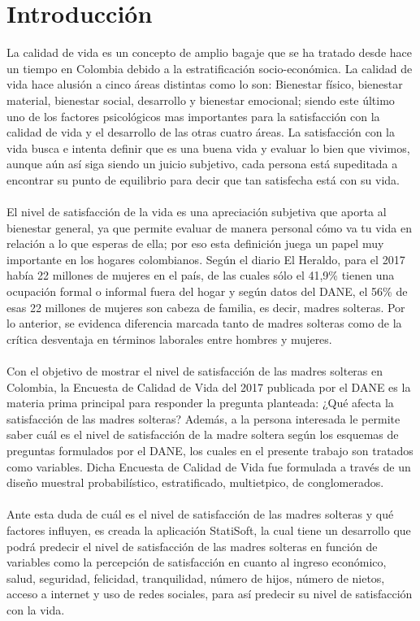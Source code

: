 \documentclass[11pt,twoside]{article}
\begin{document}
\section{Introducción}
\noindent
La calidad de vida es un concepto de amplio bagaje que se ha tratado desde hace un tiempo en Colombia debido a la estratificación socio-económica. La calidad de vida hace alusión a cinco áreas distintas como lo son: Bienestar físico, bienestar material, bienestar social, desarrollo y bienestar emocional; siendo este último uno de los factores psicológicos mas importantes para la satisfacción con la calidad de vida y el desarrollo de las otras cuatro áreas. La satisfacción con la vida busca e intenta definir  que es una buena vida y evaluar lo bien que vivimos, aunque aún así siga siendo un juicio subjetivo, cada persona está supeditada a encontrar su punto de equilibrio para decir que tan satisfecha está con su vida.
\\
\\
\noindent
El nivel de satisfacción de la vida es una apreciación subjetiva que aporta al bienestar general, ya que permite evaluar de manera personal cómo va tu vida en relación a lo que esperas de ella; por eso esta definición juega un papel muy importante en los hogares colombianos. Según el diario El Heraldo, para el 2017 había 22 millones de mujeres en el país, de las cuales sólo el 41,9{\%} tienen una ocupación formal o informal fuera del hogar y según datos del DANE, el 56{\%} de esas 22 millones de mujeres son cabeza de familia, es decir, madres solteras. Por lo anterior, se evidenca diferencia marcada tanto de madres solteras como de la crítica desventaja en términos laborales entre hombres y mujeres.
\\
\\
\noindent
Con el objetivo de mostrar el nivel de satisfacción de las madres solteras en Colombia, la Encuesta de Calidad de Vida del 2017 publicada por el DANE es la materia prima principal para responder la pregunta planteada: ¿Qué afecta la satisfacción de las madres solteras? Además, a la persona interesada le permite saber cuál es el nivel de satisfacción de la madre soltera según los esquemas de preguntas formulados por el DANE, los cuales en el presente trabajo son tratados como variables. Dicha Encuesta de Calidad de Vida fue formulada a través de un diseño muestral probabilístico, estratificado, multietpico, de conglomerados.
\\
\\
\noindent
Ante esta duda de cuál es el nivel de satisfacción de las madres solteras y qué factores influyen, es creada la aplicación StatiSoft, la cual tiene un desarrollo que podrá predecir el nivel de satisfacción de las madres solteras en función de variables como la percepción de satisfacción en cuanto al ingreso económico, salud, seguridad, felicidad, tranquilidad, número de hijos, número de nietos, acceso a internet y uso de redes sociales, para así predecir su nivel de satisfacción con la vida. 
\end{document}
